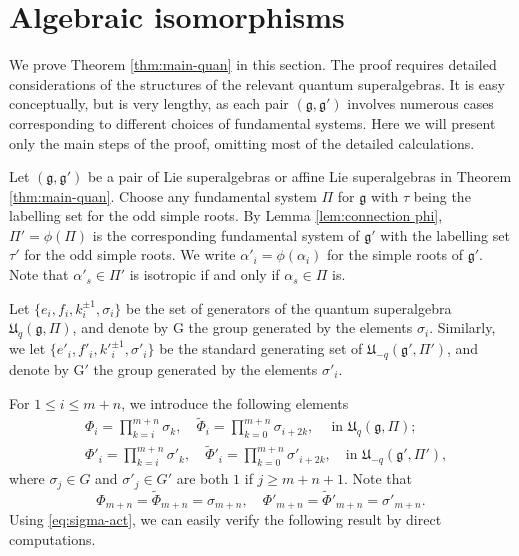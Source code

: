 \documentclass[12pt]{amsart}
\theoremstyle{definition}
\theoremstyle{remark}
\numberwithin{equation}{section}
\begin{document}
\section{Algebraic isomorphisms}\label{sect:quantum}

We prove Theorem \ref{thm:main-quan} in this section.  The proof requires
detailed considerations of the structures of the relevant quantum superalgebras.
It is easy conceptually, but is very lengthy, as each pair $({{\mathfrak g}}, {{\mathfrak g}}')$ involves
numerous cases corresponding to different choices of fundamental systems. 
Here we will present only the main steps of the proof, omitting most of the detailed calculations. 

Let $({{\mathfrak g}}, {{\mathfrak g}}')$ be  a pair of  Lie superalgebras or affine Lie superalgebras
in Theorem \ref{thm:main-quan}. Choose any fundamental system $\Pi$  for ${{\mathfrak g}}$ with $\tau$ being the labelling set for the odd simple roots. By Lemma \ref{lem:connection phi},
$\Pi'=\phi(\Pi)$ is the corresponding  fundamental system of ${{\mathfrak g}}'$ with the labelling set $\tau'$ for the odd simple roots.  
We write $\alpha'_i=\phi(\alpha_i)$ for the simple roots of ${{\mathfrak g}}'$.   Note that $\alpha'_s\in\Pi'$ is isotropic if and only if $\alpha_s\in\Pi$ is.

Let  $\{e_i, f_i, k_i^{\pm 1}, \sigma_i\}$ be the set of generators of
the quantum superalgebra ${{\mathfrak U}}_q({{\mathfrak g}}, \Pi)$, and denote by  $\mathrm{G}$
the group generated by the elements $\sigma_i$. Similarly, we let
$\{e'_i, f'_i, {k'}_i^{\pm 1}, \sigma'_i\}$ be the standard generating set of ${{\mathfrak U}}_{-q}({{\mathfrak g}}', \Pi')$, and denote by $\mathrm{G}'$
the group generated by the elements $\sigma'_i$.

For $1\leq i\leq m+n$, we introduce the following elements
\begin{align*}
&\Phi_i=\prod_{k=i}^{m+n}\sigma_k,
\quad \tilde{\Phi}_i=\prod_{k=0}^{m+n}\sigma_{i+2k},
\ \quad \text{in ${{\mathfrak U}}_q({{\mathfrak g}}, \Pi)$};\\
&\Phi'_i=\prod_{k=i}^{m+n}\sigma'_k,\quad \tilde{\Phi}'_i=\prod_{k=0}^{m+n}\sigma'_{i+2k},
\quad \text{in ${{\mathfrak U}}_{-q}({{\mathfrak g}}', \Pi')$},
\end{align*}
where $\sigma_j\in G$ and $\sigma'_j\in G'$ are both $1$ if $j\geq m+n+1$.  Note that
\[
\Phi_{m+n}=\tilde{\Phi}_{m+n}=\sigma_{m+n}, \quad  \Phi'_{m+n}=\tilde{\Phi}'_{m+n}=\sigma'_{m+n}.
\]
Using \eqref{eq:sigma-act}, we can easily verify the following result by direct computations.
\end{document}
